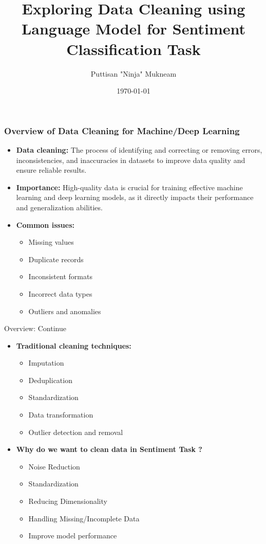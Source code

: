 \documentclass{beamer}
\title{Exploring Data Cleaning using Language Model for Sentiment Classification Task}
\author{Puttisan "Ninja" Mukneam}
\institute{Pitzer College}
\date{\today}
\begin{document}
\begin{frame}
\titlepage
\end{frame}

\begin{frame}
\frametitle{Overview of Data Cleaning for Machine/Deep Learning}

\begin{itemize}
\item \textbf{Data cleaning:} The process of identifying and correcting or removing errors, inconsistencies, and inaccuracies in datasets to improve data quality and ensure reliable results.
\item \textbf{Importance:} High-quality data is crucial for training effective machine learning and deep learning models, as it directly impacts their performance and generalization abilities.
\item \textbf{Common issues:}
\begin{itemize}
\item Missing values
\item Duplicate records
\item Inconsistent formats
\item Incorrect data types
\item Outliers and anomalies
\end{itemize}
\end{itemize}

\end{frame}

\begin{frame}{Overview: Continue}
\begin{itemize}

\item \textbf{Traditional cleaning techniques:}
\begin{itemize}
\item Imputation
\item Deduplication
\item Standardization
\item Data transformation
\item Outlier detection and removal
\end{itemize}

\item \textbf{Why do we want to clean data in Sentiment Task ?}

\begin{itemize}
    \item Noise Reduction
    \item Standardization
    \item Reducing Dimensionality
    \item Handling Missing/Incomplete Data
    \item Improve model performance
\end{itemize}

    \end{itemize}



\end{frame}
\end{document}
